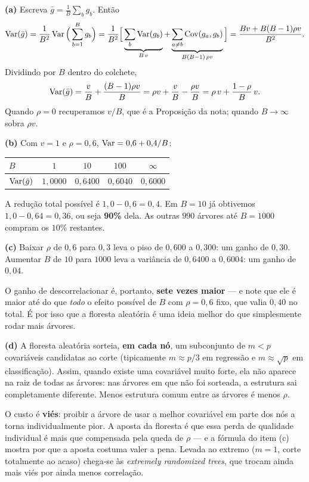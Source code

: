 \documentclass[11pt,a4paper]{article}
\begin{document}
\begin{solucao}
\textbf{(a)} Escreva $\bar g=\frac1B\sum_b g_b$. Então
\[
  \operatorname{Var}(\bar g) = \frac{1}{B^2}\operatorname{Var}\Big(\sum_{b=1}^B g_b\Big)
   = \frac{1}{B^2}\Big[\underbrace{\sum_{b}\operatorname{Var}(g_b)}_{B\,v}
       + \underbrace{\sum_{a\neq b}\operatorname{Cov}(g_a,g_b)}_{B(B-1)\,\rho v}\Big]
   = \frac{Bv + B(B-1)\rho v}{B^2}.
\]
Dividindo por $B$ dentro do colchete,
\[
  \operatorname{Var}(\bar g)= \frac{v}{B} + \frac{(B-1)\rho v}{B}
   = \rho v + \frac{v}{B} - \frac{\rho v}{B}
   = \rho\,v + \frac{1-\rho}{B}\,v .
\]
Quando $\rho=0$ recuperamos $v/B$, que é a Proposição da nota; quando $B\to\infty$
sobra $\rho v$.

\smallskip
\textbf{(b)} Com $v=1$ e $\rho=0{,}6$, $\operatorname{Var}=0{,}6+0{,}4/B$:
\begin{center}\small
\begin{tabular}{@{}lcccc@{}}
\toprule
$B$ & $1$ & $10$ & $100$ & $\infty$ \\
\midrule
$\operatorname{Var}(\bar g)$ & $1{,}0000$ & $0{,}6400$ & $0{,}6040$ & $0{,}6000$ \\
\bottomrule
\end{tabular}
\end{center}
A redução total possível é $1{,}0-0{,}6=0{,}4$. Em $B=10$ já obtivemos
$1{,}0-0{,}64=0{,}36$, ou seja \textbf{90\%} dela. As outras $990$ árvores até
$B=1000$ compram os $10\%$ restantes.

\smallskip
\textbf{(c)} Baixar $\rho$ de $0{,}6$ para $0{,}3$ leva o piso de $0{,}600$ a
$0{,}300$: um ganho de $0{,}30$. Aumentar $B$ de $10$ para $1000$ leva a
variância de $0{,}6400$ a $0{,}6004$: um ganho de $0{,}04$.

O ganho de descorrelacionar é, portanto, \textbf{sete vezes maior} --- e note que
ele é maior até do que \emph{todo} o efeito possível de $B$ com $\rho=0{,}6$
fixo, que valia $0{,}40$ no total. É por isso que a floresta aleatória é uma ideia
melhor do que simplesmente rodar mais árvores.

\smallskip
\textbf{(d)} A floresta aleatória sorteia, \textbf{em cada nó}, um subconjunto de
$m<p$ covariáveis candidatas ao corte (tipicamente $m\approx p/3$ em regressão e
$m\approx\sqrt p$ em classificação). Assim, quando existe uma covariável muito
forte, ela não aparece na raiz de todas as árvores: nas árvores em que não foi
sorteada, a estrutura sai completamente diferente. Menos estrutura comum entre as
árvores é menos $\rho$.

O custo é \textbf{viés}: proibir a árvore de usar a melhor covariável em parte
dos nós a torna individualmente pior. A aposta da floresta é que essa perda de
qualidade individual é mais que compensada pela queda de $\rho$ --- e a fórmula
do item (c) mostra por que a aposta costuma valer a pena. Levada ao extremo
($m=1$, corte totalmente ao acaso) chega-se às \emph{extremely randomized trees},
que trocam ainda mais viés por ainda menos correlação.
\end{solucao}
\end{document}
